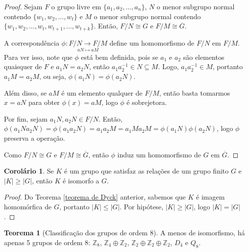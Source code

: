 \documentclass[a4paper,portuguese,11pt,twoside, leqno]{book}
\theoremstyle{definition}
\newtheorem{theorem}{Teorema}[section]
\newtheorem{corollary}{Corolário}[theorem]
\begin{document}
	\begin{proof}
		Sejam $F$ o grupo livre em $\{a_1, a_2, \dots, a_n\}$, $N$ o menor subgrupo normal contendo $\{w_1, w_2, \dots, w_t\}$ e $M$ o menor subgrupo normal contendo $\{w_1, w_2, \dots, w_t, w_{t+1}, \dots, w_{t+k}\}$. Então, $F/N\cong G$ e $F/M\cong \overline{G}$. 
		
		\par\vspace{0.3cm} A correspondência $\phi:\underset{aN\mapsto aM}{F/N\to F/M}$ define um homomorfismo de $F/N$ em $F/M$. Para ver isso, note que $\phi$ está bem definida, pois se $a_1$ e $a_2$ são elementos quaisquer de $F$ e $a_1N=a_2N$, então $a_1a_2^{-1}\in N\subseteq M$. Logo, $a_1a_2^{-1}\in M$, portanto $a_1M=a_2M$, ou seja, $\phi(a_1N)=\phi(a_2N)$.
		
		\par\vspace{0.3cm} Além disso, se $aM$ é um elemento qualquer de $F/M$, então basta tomarmos $x=aN$ para obter $\phi(x)=aM$, logo $\phi$ é sobrejetora.
		
		Por fim, sejam $a_1N,a_2N\in F/N$. Então, $\phi(a_1Na_2N)=\phi(a_1a_2N)=a_1a_2M=a_1Ma_2M=\phi(a_1N)\phi(a_2N)$, logo $\phi$ preserva a operação. 
		
		Como $F/N\cong G$ e $F/M\cong \overline{G}$, então $\phi$ induz um homomorfismo de $G$ em $\overline{G}$.
	\end{proof}
	
	\par\vspace{0.3cm}
	
	\begin{corollary}
		\label{corolario de Dyck}
		Se $K$ é um grupo que satisfaz as relações de um grupo finito $G$ e $|K|\geq |G|$, então $K$ é isomorfo a $G$.
	\end{corollary}
	
	\begin{proof}
		Do Teorema \eqref{teorema de Dyck} anterior, sabemos que $K$ é imagem homomórfica de $G$, portanto $|K|\leq |G|$. Por hipótese, $|K|\geq |G|$, logo $|K| = |G|$. 
	\end{proof}
	
	\par\vspace{0.3cm}
	
	\begin{theorem}[Classificação dos grupos de ordem 8]
		\label{classificacao grupos de ordem 8}
		A menos de isomorfismo, há apenas 5 grupos de ordem 8: $\mathbb{Z}_8$, $\mathbb{Z}_4\oplus\mathbb{Z}_2$, $\mathbb{Z}_2\oplus\mathbb{Z}_2\oplus\mathbb{Z}_2$, $D_4$ e $Q_8$. %
	\end{theorem}
	
\end{document}
